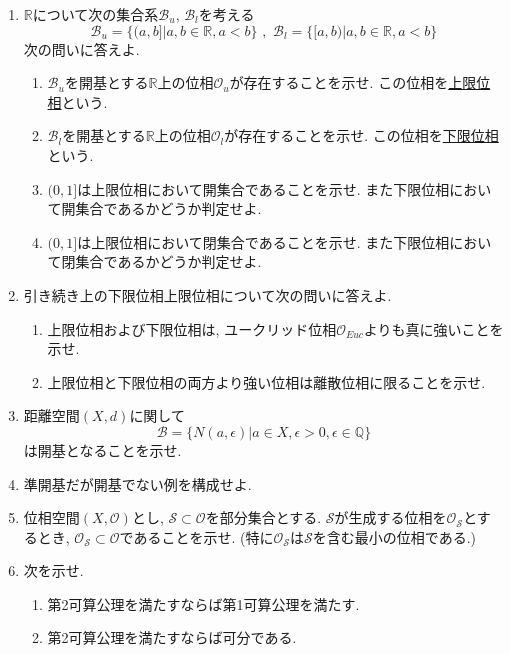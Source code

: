 \documentclass[dvipdfmx,a4paper,11pt]{article}
\newcommand{\R}{\mathbb{R}}
\newcommand{\Q}{\mathbb{Q}}
\theoremstyle{definition}
\begin{document}
\begin{enumerate}[ label=\textbf{問}4.\arabic*]


\item $\R$について次の集合系$\mathscr{B}_u$, $\mathscr{B}_l$を考える
$$
\mathscr{B}_u = \{(a,b]| a,b \in \R, a<b\} \,\,,\,\,
\mathscr{B}_l = \{[a,b)| a,b \in \R, a<b\}
$$
次の問いに答えよ.
	\begin{enumerate}
	\item $\mathscr{B}_u $を開基とする$\R$上の位相$\mathscr{O}_u$が存在することを示せ. この位相を\underline{上限位相}という.
	\item $\mathscr{B}_l$を開基とする$\R$上の位相$\mathscr{O}_l$が存在することを示せ. この位相を\underline{下限位相}という.
	\item $(0,1]$は上限位相において開集合であることを示せ. また下限位相において開集合であるかどうか判定せよ.
	\item $(0,1]$は上限位相において閉集合であることを示せ. また下限位相において閉集合であるかどうか判定せよ.
	\end{enumerate}
\item 引き続き上の下限位相上限位相について次の問いに答えよ.
	\begin{enumerate}
	\item 上限位相および下限位相は, ユークリッド位相$\mathscr{O}_{Euc}$よりも真に強いことを示せ.
	\item 上限位相と下限位相の両方より強い位相は離散位相に限ることを示せ.
	\end{enumerate}

\item 距離空間$(X,d)$に関して
$$\mathscr{B} = \{ N(a,\epsilon) | a \in X, \epsilon >0, \epsilon \in \Q\}
$$
は開基となることを示せ.
\item 準開基だが開基でない例を構成せよ.
\item 位相空間$(X, \mathscr{O})$とし, $\mathscr{S} \subset \mathscr{O}$を部分集合とする.
$\mathscr{S}$が生成する位相を$\mathscr{O}_{\mathscr{S}}$とするとき, $\mathscr{O}_{\mathscr{S}} \subset \mathscr{O}$であることを示せ. (特に$\mathscr{O}_{\mathscr{S}}$は$\mathscr{S}$を含む最小の位相である.)


\item 次を示せ.
	\begin{enumerate}
	\item 第2可算公理を満たすならば第1可算公理を満たす.
	\item 第2可算公理を満たすならば可分である.
	\end{enumerate}


\end{enumerate}
\end{document}
